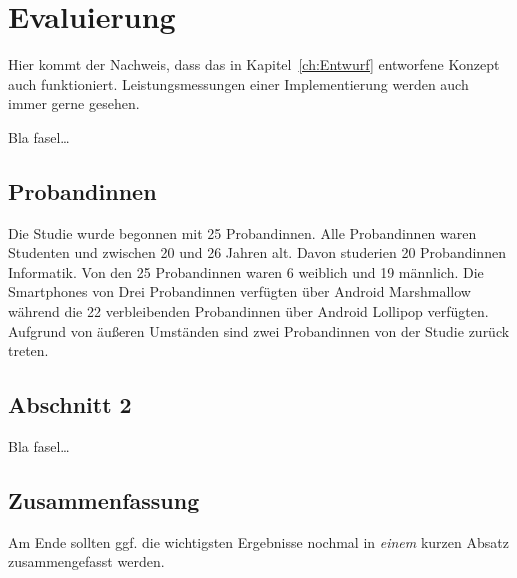 
\chapter{Evaluierung}
\label{ch:Evaluierung}
Hier kommt der Nachweis, dass das in Kapitel~\ref{ch:Entwurf}
entworfene Konzept auch funktioniert. Leistungsmessungen einer
Implementierung werden auch immer gerne gesehen.

Bla fasel\ldots

\section{Probandinnen}
\label{ch:Evaluierung:sec:Abschnitt1}

Die Studie wurde begonnen mit 25 Probandinnen.
Alle Probandinnen waren Studenten und zwischen 20 und 26 Jahren alt.
Davon studerien 20 Probandinnen Informatik. 
Von den 25 Probandinnen waren 6 weiblich und 19 männlich.
Die Smartphones von Drei Probandinnen verfügten über Android Marshmallow während die 22 verbleibenden Probandinnen über Android Lollipop verfügten.  
Aufgrund von äußeren Umständen sind zwei Probandinnen von der Studie zurück treten.


\section{Abschnitt 2}
\label{ch:Evaluierung:sec:Abschnitt2}

Bla fasel\ldots

\section{Zusammenfassung}
\label{ch:Evaluierung:sec:zusammenfassung}

Am Ende sollten ggf. die wichtigsten Ergebnisse nochmal in \emph{einem}
kurzen Absatz zusammengefasst werden.

